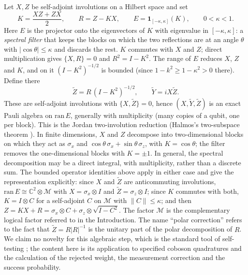 \documentclass[11pt,a4paper]{article}
\newcommand{\Zt}{\widetilde Z}
\newcommand{\Yt}{\widetilde Y}
\begin{document}
Let $X,Z$ be self-adjoint involutions on a Hilbert space and set
\begin{equation}
K=\frac{XZ+ZX}{2},\qquad R=Z-KX,\qquad E=\mathbf 1_{[-\kappa,\kappa]}(K),\qquad 0<\kappa<1 .
\label{eq:KRE}
\end{equation}
Here $E$ is the projector onto the eigenvectors of $K$ with eigenvalue in $[-\kappa,\kappa]$: a \emph{spectral filter} that keeps the blocks on which the two reflections are at an angle $\theta$ with $|\cos\theta|\le\kappa$ and discards the rest. $K$ commutes with $X$ and $Z$; direct multiplication gives $\{X,R\}=0$ and $R^2=I-K^2$. The range of $E$ reduces $X$, $Z$ and $K$, and on it $(I-K^2)^{-1/2}$ is bounded (since $1-k^2\ge1-\kappa^2>0$ there). Define there
\begin{equation}
\Zt=R\,(I-K^2)^{-1/2},\qquad \Yt=iX\Zt .
\label{eq:polar}
\end{equation}
These are self-adjoint involutions with $\{X,\Zt\}=0$, hence $(X,\Yt,\Zt)$ is an exact Pauli algebra on $\mathrm{ran}\,E$, generally with multiplicity (many copies of a qubit, one per block). This is the Jordan two-involution reduction (Halmos's two-subspace theorem \cite{Halmos1969}). In finite dimensions, $X$ and $Z$ decompose into two-dimensional blocks on which they act as $\sigma_x$ and $\cos\theta\,\sigma_x+\sin\theta\,\sigma_z$, with $K=\cos\theta$; the filter removes the one-dimensional blocks with $K=\pm1$. In general, the spectral decomposition may be a direct integral, with multiplicity, rather than a discrete sum. The bounded operator identities above apply in either case and give the representation explicitly: since $X$ and $\Zt$ are anticommuting involutions, $\mathrm{ran}\,E\cong\mathbb C^2\otimes\mathcal M$ with $X=\sigma_x\otimes I$ and $\Zt=\sigma_z\otimes I$; since $K$ commutes with both, $K=I\otimes C$ for a self-adjoint $C$ on $\mathcal M$ with $\|C\|\le\kappa$; and then $Z=KX+R=\sigma_x\otimes C+\sigma_z\otimes\sqrt{I-C^2}$. The factor $\mathcal M$ is the complementary logical factor referred to in the Introduction. The name ``polar correction'' refers to the fact that $\Zt=R|R|^{-1}$ is the unitary part of the polar decomposition of $R$. We claim no novelty for this algebraic step, which is the standard tool of self-testing \cite{Masanes2005,Kaniewski2016,Supic2020}; the content here is its application to specified coboson quadratures and the calculation of the rejected weight, the measurement correction and the success probability.
\end{document}
